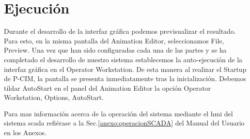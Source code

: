 

\section{Ejecución}
\label{sec:Ejecucion}
Durante el desarrollo de la interfaz gráfica podemos previsualizar 
el resultado. Para esto, en la misma pantalla del Animation Editor, 
seleccionamos File, Preview. Una vez que han sido configuradas cada una de las 
partes y se ha completado el desarrollo de nuestro sistema establecemos 
la auto-ejecución de la interfaz gráfica en el Operator Workstation. De esta 
manera al realizar el Startup de P-CIM, la pantalla se presenta inmediatamente 
tras la inicialización. Debemos tildar AutoStart en el panel del Animation 
Editor la opción Operator Workstation, Options, AutoStart.

Para mas información acerca de la operación del sistema mediante el \gls{hmi} 
del sistema \gls{scada} refiérase a la Sec.\ref{anexo:operacionSCADA} del 
Manual del Usuario en los Anexos.
